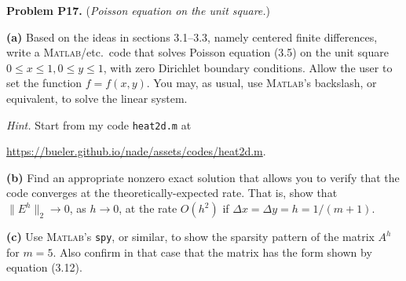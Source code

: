 \documentclass[12pt]{amsart}
\newcommand{\Matlab}{\textsc{Matlab}\xspace}
\newcommand{\prob}[1]{\bigskip\noindent\textbf{#1}\quad }
\newcommand{\epart}[1]{\medskip\noindent\textbf{(#1)}\quad }
\begin{document}
\prob{Problem P17.}  (\emph{Poisson equation on the unit square.})

\epart{a}  Based on the ideas in sections 3.1--3.3, namely centered finite differences, write a \Matlab/etc.~code that solves Poisson equation (3.5) on the unit square $0\le x \le 1, 0 \le y \le 1$, with zero Dirichlet boundary conditions.  Allow the user to set the function $f=f(x,y)$.  You may, as usual, use \Matlab's backslash, or equivalent, to solve the linear system.

\medskip
\noindent \emph{Hint.}  Start from my code \texttt{heat2d.m} at

\url{https://bueler.github.io/nade/assets/codes/heat2d.m}.

\epart{b}  Find an appropriate nonzero exact solution that allows you to verify that the code converges at the theoretically-expected rate.  That is, show that $\|E^h\|_2 \to 0$, as $h\to 0$, at the rate $O(h^2)$ if $\Delta x = \Delta y = h = 1 / (m+1)$.

\epart{c}  Use \Matlab's \texttt{spy}, or similar, to show the sparsity pattern of the matrix $A^h$ for $m=5$.  Also confirm in that case that the matrix has the form shown by equation (3.12).
\end{document}
